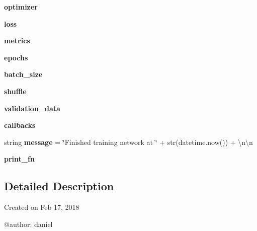 \begin{DoxyCompactItemize}
\item 
\mbox{\label{namespaceTrainModels2_a98dfcd292d8c113a1edf423106fefd6b}} 
{\bfseries optimizer}
\item 
\mbox{\label{namespaceTrainModels2_a7fcbb68181b39926bf753cdc7deb922e}} 
{\bfseries loss}
\item 
\mbox{\label{namespaceTrainModels2_a13a16077d7b4119ff05269c44f73785b}} 
{\bfseries metrics}
\item 
\mbox{\label{namespaceTrainModels2_a10e4cc86cc40f5270cbbe6c161b2c314}} 
{\bfseries epochs}
\item 
\mbox{\label{namespaceTrainModels2_a77ec13a50711c09e35624e60dae40901}} 
{\bfseries batch\+\_\+size}
\item 
\mbox{\label{namespaceTrainModels2_adfc76634c903fa1edb79d42a1ac4d536}} 
{\bfseries shuffle}
\item 
\mbox{\label{namespaceTrainModels2_a87b8de6eb7736570a243a205449a1dbe}} 
{\bfseries validation\+\_\+data}
\item 
\mbox{\label{namespaceTrainModels2_a7124d3f2101fe512aa51861596ec3e4c}} 
{\bfseries callbacks}
\item 
\mbox{\label{namespaceTrainModels2_ac4dc5f36eaec486b800268732575c828}} 
string {\bfseries message} = \char`\"{}Finished training network at \char`\"{} + str(datetime.\+now()) + \textquotesingle{}\textbackslash{}n\textbackslash{}n\textquotesingle{}
\item 
\mbox{\label{namespaceTrainModels2_a6f2aaa0024947b8989edfe7739e87c71}} 
{\bfseries print\+\_\+fn}
\end{DoxyCompactItemize}


\subsection{Detailed Description}
\begin{DoxyVerb}Created on Feb 17, 2018

@author: daniel
\end{DoxyVerb}
 